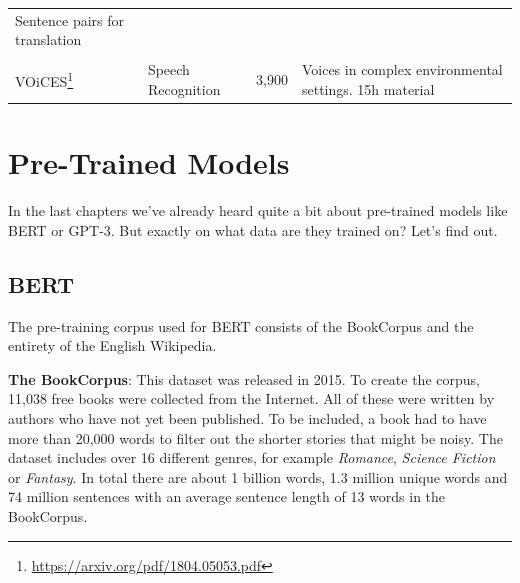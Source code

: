 \documentclass[]{krantz}
\renewcommand{\href}[2]{#2\footnote{\url{#1}}}
\begin{document}
\begin{longtable}[]{@{}llll@{}}
\begin{minipage}[t]{0.23\columnwidth}
Sentence pairs for translation\strut
\end{minipage}\tabularnewline
\begin{minipage}[t]{0.31\columnwidth}\raggedright
\strut
\end{minipage} & \begin{minipage}[t]{0.24\columnwidth}\raggedright
\strut
\end{minipage} & \begin{minipage}[t]{0.10\columnwidth}\raggedright
\strut
\end{minipage} & \begin{minipage}[t]{0.23\columnwidth}\raggedright
\strut
\end{minipage}\tabularnewline
\begin{minipage}[t]{0.31\columnwidth}\raggedright
\href{https://arxiv.org/pdf/1804.05053.pdf}{VOiCES}\strut
\end{minipage} & \begin{minipage}[t]{0.24\columnwidth}\raggedright
Speech Recognition\strut
\end{minipage} & \begin{minipage}[t]{0.10\columnwidth}\raggedright
3,900\strut
\end{minipage} & \begin{minipage}[t]{0.23\columnwidth}\raggedright
Voices in complex environmental settings. 15h material\strut
\end{minipage}\tabularnewline
\bottomrule
\end{longtable}

\hypertarget{pre-trained-models}{%
\section{Pre-Trained Models}\label{pre-trained-models}}

In the last chapters we've already heard quite a bit about pre-trained models like BERT or GPT-3. But exactly on what data are they trained on? Let's find out.

\hypertarget{bert}{%
\subsection{BERT}\label{bert}}

The pre-training corpus used for BERT consists of the BookCorpus and the entirety of the English Wikipedia.

\textbf{The BookCorpus}: This dataset was released in 2015. To create the corpus, 11,038 free books were collected from the Internet. All of these were written by authors who have not yet been published. To be included, a book had to have more than 20,000 words to filter out the shorter stories that might be noisy. The dataset includes over 16 different genres, for example \emph{Romance}, \emph{Science Fiction} or \emph{Fantasy}. In total there are about 1 billion words, 1.3 million unique words and 74 million sentences with an average sentence length of 13 words in the BookCorpus. \citep{bookCorpus}
\end{document}
